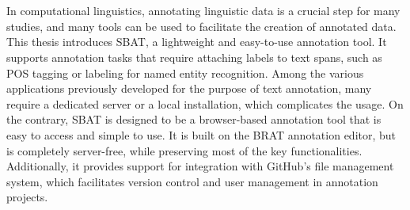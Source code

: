 \documentclass[12ptm a4paper]{article}
\begin{document}
%
\newpage
\section*{}
In computational linguistics, annotating linguistic data is a crucial step for many studies, and many tools can be used to facilitate the creation of annotated data. This thesis introduces SBAT, a lightweight and easy-to-use annotation tool. It supports annotation tasks that require attaching labels to text spans, such as POS tagging or labeling for named entity recognition. Among the various applications previously developed for the purpose of text annotation, many require a dedicated server or a local installation, which complicates the usage. On the contrary, SBAT is designed to be a browser-based annotation tool that is easy to access and simple to use. It is built on the BRAT annotation editor, but is completely server-free, while preserving most of the key functionalities. Additionally, it provides support for integration with GitHub's file management system, which facilitates version control and user management in annotation projects.
\newpage
\tableofcontents
\newpage
\listoffigures
\newpage
{}
\end{document}
